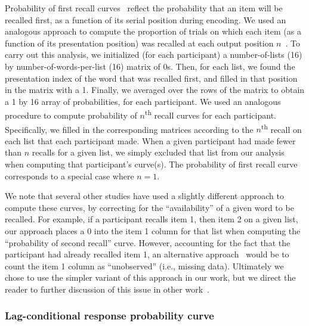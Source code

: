 \documentclass[11pt]{article}
\begin{document}
Probability of first recall curves~\citep{AtkiShif68, PostPhil65, WelcBurn24}
reflect the probability that an item will be recalled first, as a function of
its serial position during encoding. We used an analogous approach to compute
the proportion of trials on which each item (as a function of its presentation
position) was recalled at each output position $n$~\citep{Hoga75, HowaKaha99,
PolyEtal09, ZhanEtal23}. To carry out this analysis, we initialized (for each
participant) a number-of-lists (16) by number-of-words-per-list (16) matrix of
0s. Then, for each list, we found the presentation index of the word that was recalled
first, and filled in that position in the matrix with a 1. Finally, we
averaged over the rows of the matrix to obtain a 1 by 16 array of
probabilities, for each participant. We used an analogous procedure to compute
probability of $n$\textsuperscript{th} recall curves for each participant.
Specifically, we filled in the corresponding matrices according to the
$n$\textsuperscript{th} recall on each list that each participant made. When a
given participant had made fewer than $n$ recalls for a given list, we simply
excluded that list from our analysis when computing that participant's
curve(s). The probability of first recall curve corresponds to a special case
where $n = 1$.

We note that several other studies have used a slightly different approach to
compute these curves, by correcting for the ``availability'' of a given word to
be recalled. For example, if a participant recalls item 1, then item 2 on a
given list, our approach places a 0 into the item 1 column for that list when
computing the ``probability of second recall'' curve. However, accounting for
the fact that the participant had already recalled item 1, an alternative
approach~\citep[e.g.,][]{Farr10} would be to count the item 1 column as
``unobserved'' (i.e., missing data). Ultimately we chose to use the simpler
variant of this approach in our work, but we direct the reader to further
discussion of this issue in other work~\citep{MoraGosh14, Farr14}.

\subsubsection*{Lag-conditional response probability curve}
\end{document}
